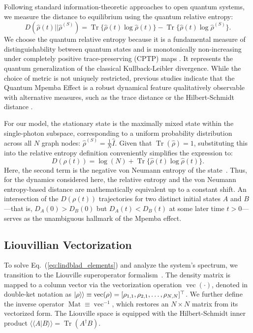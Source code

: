 \documentclass[pdflatex,sn-mathphys-num]{sn-jnl}
\renewcommand{\textcolor}[2]{#2}
\newcommand{\ketket}[1]{\left| #1 \right\rangle \! \mathclose{\left. \vphantom{#1} \right\rangle}}
\begin{document}
{
Following standard information-theoretic approaches to open quantum systems, we measure the distance to \textcolor{green}{equilibrium using the quantum relative entropy}:
\begin{equation}
D(\hat{\rho}(t) || \hat{\rho}^{(S)}) = \operatorname{Tr}\{\hat{\rho}(t) \log \hat{\rho}(t)\} - \operatorname{Tr}\{\hat{\rho}(t) \log \hat{\rho}^{(S)}\}.
\end{equation}
We choose the quantum relative entropy because it is a fundamental measure of distinguishability between quantum states and is \textcolor{green}{monotonically non-increasing} under completely positive trace-preserving (CPTP) maps \cite{vedral2002}. \textcolor{green}{It represents the quantum generalization of the classical Kullback-Leibler divergence.} While the choice of metric is not uniquely restricted, previous studies indicate that the Quantum Mpemba Effect is a robust dynamical feature qualitatively observable with alternative measures, such as the trace distance or the Hilbert-Schmidt distance \cite{Carollo2021}.

For our model, the stationary state is the maximally mixed state within the single-photon subspace, corresponding to a uniform probability distribution across all $N$ graph nodes: $\hat{\rho}^{(S)} = \frac{1}{N} \hat{I}$. Given that $\operatorname{Tr}(\hat{\rho}) = 1$, substituting this into the relative entropy definition conveniently simplifies the expression to:
\begin{equation}
D(\rho(t)) = \log(N) + \operatorname{Tr}\{\hat{\rho}(t) \log \hat{\rho}(t)\}.
\label{eq:metric}
\end{equation}
Here, the second term is the negative von Neumann entropy of the state~\cite{neumann}. Thus, for the dynamics considered here, the relative entropy and the von Neumann entropy-based distance are mathematically equivalent up to a constant shift. An intersection of the $D(\rho(t))$ trajectories for two distinct initial states $A$ and $B$---that is, $D_A(0) > D_B(0)$ but $D_A(t) < D_B(t)$ at some later time $t>0$---serves as the unambiguous hallmark of the Mpemba effect.
}
\subsection{Liouvillian Vectorization}
To solve Eq.~(\ref{eq:lindblad_elements}) and analyze the system's spectrum, we transition to the Liouville superoperator formalism~\cite{gyamfi2020}. The density matrix is mapped to a column vector via the vectorization operation $\operatorname{vec}(\cdot)$, denoted in double-ket notation as $\ketket{\rho} \equiv \operatorname{vec}(\rho) = [\rho_{1,1}, \rho_{2,1}, \dots, \rho_{N,N}]^\top$. \textcolor{green}{We further define the inverse operator $\operatorname{Mat} \equiv \operatorname{vec}^{-1}$, which restores an $N \times N$ matrix from its vectorized form.} The Liouville space is equipped with the Hilbert-Schmidt inner product $\langle\langle A | B \rangle\rangle = \operatorname{Tr}(A^\dagger B)$.
\end{document}
